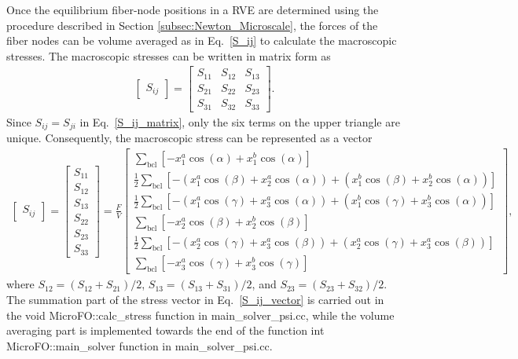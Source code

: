 Once the equilibrium fiber-node positions in a RVE are determined using the procedure described in Section \ref{subsec:Newton_Microscale}, the forces of the fiber nodes can be volume averaged as in Eq.\ \eqref{S_ij} to calculate the macroscopic stresses. The macroscopic stresses can be written in matrix form as
%
\begin{eqnarray}
\begin{bmatrix}
S_{ij}
\end{bmatrix} = 
%
\begin{bmatrix}
S_{11} & S_{12} & S_{13} \\
S_{21} & S_{22} & S_{23} \\
S_{31} & S_{32} & S_{33} 
\end{bmatrix} .
\label{S_ij_matrix}
\end{eqnarray}
%
Since $S_{ij} = S_{ji}$ in Eq.\ \eqref{S_ij_matrix}, only the six terms on the upper triangle are unique. Consequently, the macroscopic stress can be represented as a vector
%
\begin{eqnarray}
\begin{bmatrix}
S_{ij}
\end{bmatrix} = 
%
\begin{bmatrix}
S_{11} \\ S_{12} \\ S_{13} \\ S_{22} \\ S_{23} \\ S_{33} 
\end{bmatrix} =
%
\frac{F}{V} \begin{bmatrix}
\sum_{\text{bcl}} \left[ - x^a_1  \cos(\alpha) + x^b_1 \cos(\alpha) \right] \\ 
%
\frac{1}{2}\sum_{\text{bcl}}  \left[-\left( x^a_1  \cos(\beta)+ x^a_2 \cos(\alpha) \right) + \left( x^b_1  \cos(\beta)+ x^b_2 \cos(\alpha) \right) \right] \\ 
%
\frac{1}{2}\sum_{\text{bcl}} \left[ -\left(x^a_1 \cos(\gamma) + x^a_3 \cos(\alpha) \right) + \left(x^b_1 \cos(\gamma) + x^b_3 \cos(\alpha) \right) \right] \\ 
%
\sum_{\text{bcl}} \left[-x^a_2 \cos(\beta) + x^b_2 \cos(\beta) \right]\\
%
\frac{1}{2} \sum_{\text{bcl}} \left[-\left(x^a_2 \cos(\gamma) + x^a_3 \cos(\beta) \right) + \left(x^a_2 \cos(\gamma) + x^a_3 \cos(\beta) \right)\right] \\
%
\sum_{\text{bcl}} \left[ -x^a_3 \cos(\gamma) + x^b_3 \cos(\gamma) \right]
\end{bmatrix}  ,
\label{S_ij_vector}
\end{eqnarray}
%
where $S_{12} = (S_{12}+S_{21})/2$, $S_{13} = (S_{13}+S_{31})/2$, and $S_{23} = (S_{23}+S_{32})/2$. The summation part of the stress vector in Eq.\ \eqref{S_ij_vector} is carried out in the void MicroFO::calc\_stress function in main\_solver\_psi.cc, while the volume averaging part is implemented towards the end of the function int MicroFO::main\_solver function in main\_solver\_psi.cc.

